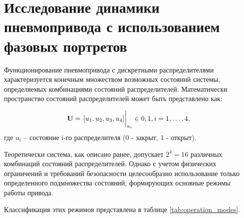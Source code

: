 \section{Исследование динамики пневмопривода с использованием фазовых портретов}

Функционирование пневмопривода с дискретными распределителями характеризуется конечным
множеством возможных состояний системы, определяемых комбинациями состояний распределителей.
Математически пространство состояний распределителей может быть представлено как:

\begin{equation}\label{eq:state_space}
	\mathbf{U} = \eval{[u_1, u_2, u_3, u_4]}_{u_i} \in {0,1}, i = 1,\dots,4,
\end{equation}
где $u_i$ -- состояние i-го распределителя (0 - закрыт, 1 - открыт).

Теоретически система, как описано ранее, допускает $2^4 = 16$ различных комбинаций состояний распределителей.
Однако с учетом физических ограничений и требований безопасности целесообразно использование только определенного
подмножества состояний, формирующих основные режимы работы привода.

Классификация этих режимов представлена в таблице \ref{tab:operation_modes}.

